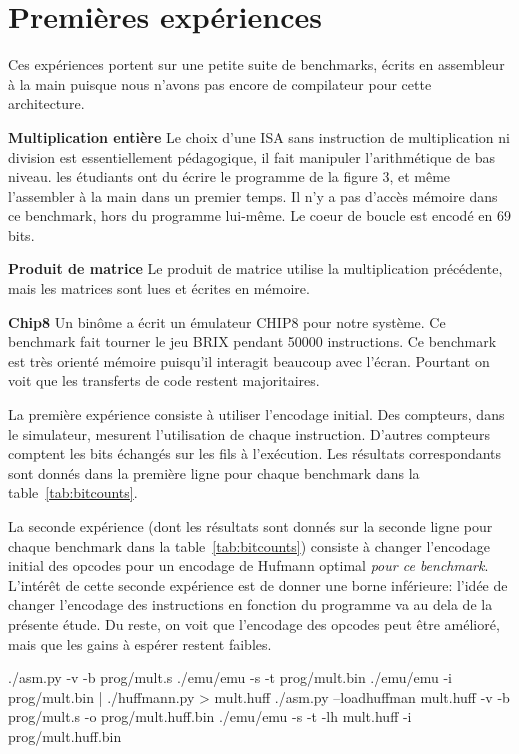 \documentclass[architecture]{compas2018}
\newcommand{\todo}[1]{\textcolor{red}{TODO: #1}}
\begin{document}
\fi

\section{Premières expériences}
Ces expériences portent sur une petite suite de benchmarks, écrits en assembleur à la main puisque nous n'avons pas encore de compilateur pour cette architecture.

\textbf{Multiplication entière} Le choix d'une ISA sans instruction de multiplication ni division est essentiellement pédagogique, il fait manipuler l'arithmétique de bas niveau.
les étudiants ont du écrire le programme de la figure 3, et même l'assembler à la main dans un premier temps. Il n'y a pas d'accès mémoire dans ce benchmark, hors du programme lui-même. Le coeur de boucle est encodé en 69 bits.



\textbf{Produit de matrice}
Le produit de matrice utilise la multiplication précédente, mais les matrices sont lues et écrites en mémoire.

\textbf{Chip8}
Un binôme a écrit un émulateur CHIP8 \cite{Chip8:1978} pour notre système.
Ce benchmark fait tourner le jeu BRIX pendant 50000 instructions.
Ce benchmark est très orienté mémoire puisqu'il interagit beaucoup avec l'écran.
Pourtant on voit que les transferts de code restent majoritaires.


La première expérience consiste à utiliser l'encodage initial.
Des compteurs, dans le simulateur, mesurent l'utilisation de chaque instruction.%
D'autres compteurs comptent les bits échangés sur les fils à l'exécution.
Les résultats correspondants sont donnés dans la première  ligne pour chaque benchmark dans la table~\ref{tab:bitcounts}.

La seconde expérience (dont les résultats sont donnés sur la seconde ligne pour chaque benchmark dans la table~\ref{tab:bitcounts}) consiste à changer l'encodage initial des opcodes pour un encodage de Hufmann optimal \emph{pour ce benchmark}.
L'intérêt de cette seconde expérience est de donner une borne inférieure: l'idée de changer l'encodage des instructions en fonction du programme va au dela de la présente étude.
Du reste, on voit que l'encodage des opcodes peut être amélioré, mais que les gains à espérer restent faibles.


\iffalse
./asm.py -v -b prog/mult.s
./emu/emu -s -t prog/mult.bin
./emu/emu -i prog/mult.bin | ./huffmann.py > mult.huff
./asm.py --loadhuffman mult.huff -v -b prog/mult.s -o  prog/mult.huff.bin
./emu/emu -s -t -lh mult.huff -i prog/mult.huff.bin
\end{document}
